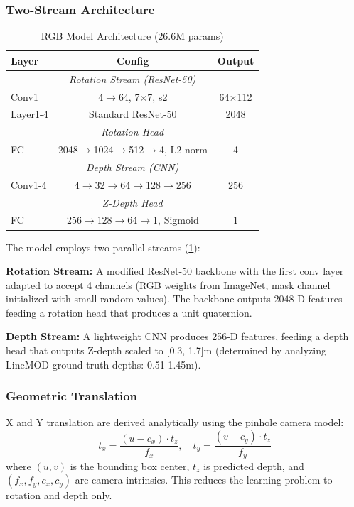 \subsubsection{Two-Stream Architecture}
\begin{table}[h]
\centering
\caption{RGB Model Architecture (26.6M params)}
\label{tab:rgb_arch}
\scriptsize
\begin{tabular}{l|c|c}
\toprule
\textbf{Layer} & \textbf{Config} & \textbf{Output} \\
\midrule
\multicolumn{3}{c}{\textit{Rotation Stream (ResNet-50)}} \\
\midrule
Conv1 & 4$\to$64, 7$\times$7, s2 & 64$\times$112 \\
Layer1-4 & Standard ResNet-50 & 2048 \\
\midrule
\multicolumn{3}{c}{\textit{Rotation Head}} \\
\midrule
FC & 2048$\to$1024$\to$512$\to$4, L2-norm & 4 \\
\midrule
\multicolumn{3}{c}{\textit{Depth Stream (CNN)}} \\
\midrule
Conv1-4 & 4$\to$32$\to$64$\to$128$\to$256 & 256 \\
\midrule
\multicolumn{3}{c}{\textit{Z-Depth Head}} \\
\midrule
FC & 256$\to$128$\to$64$\to$1, Sigmoid & 1 \\
\bottomrule
\end{tabular}
\end{table}

The model employs two parallel streams (\cref{tab:rgb_arch}):

\textbf{Rotation Stream:} A modified ResNet-50 backbone with the first conv layer adapted to accept 4 channels (RGB weights from ImageNet, mask channel initialized with small random values). The backbone outputs 2048-D features feeding a rotation head that produces a unit quaternion.

\textbf{Depth Stream:} A lightweight CNN produces 256-D features, feeding a depth head that outputs Z-depth scaled to [0.3, 1.7]m (determined by analyzing LineMOD ground truth depths: 0.51-1.45m).



\subsubsection{Geometric Translation}
X and Y translation are derived analytically using the pinhole camera model:
\begin{equation}
    t_x = \frac{(u - c_x) \cdot t_z}{f_x}, \quad t_y = \frac{(v - c_y) \cdot t_z}{f_y}
\end{equation}
where $(u, v)$ is the bounding box center, $t_z$ is predicted depth, and $(f_x, f_y, c_x, c_y)$ are camera intrinsics. This reduces the learning problem to rotation and depth only.

